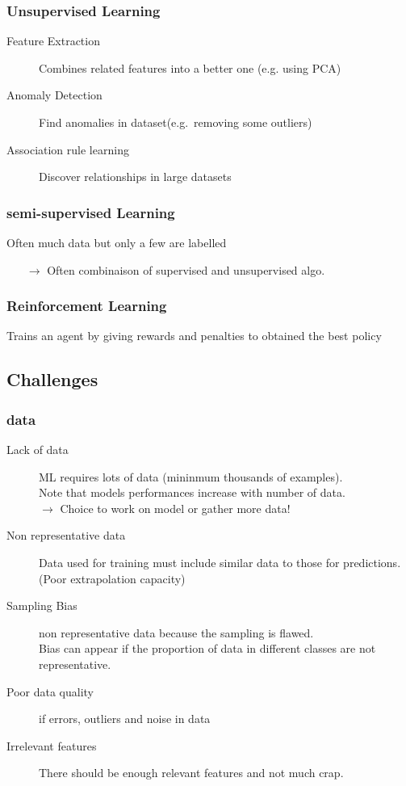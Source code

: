 \subsubsection{Unsupervised Learning}
\begin{description}
    \item[Feature Extraction] Combines related features into a better one (e.g. using PCA)
    \item[Anomaly Detection] Find anomalies in dataset(e.g.\ removing some outliers)
    \item[Association rule learning] Discover relationships in large datasets
\end{description}

\subsubsection{semi-supervised Learning}
Often much data but only a few are labelled
\begin{itemize}
  \item[$\rightarrow$] Often combinaison of supervised and unsupervised algo.
\end{itemize}

\subsubsection{Reinforcement Learning}
Trains an agent by giving rewards and penalties to obtained the best policy

\subsection{Challenges}
\subsubsection{data}
\begin{description}
  \item[Lack of data] ML requires lots of data (mininmum thousands of examples).\\
                      Note that models performances increase with number of data.\\
                      $\rightarrow$ Choice to work on model or gather more data!

  \item[Non representative data] Data used for training must include similar data to those for predictions. (Poor extrapolation capacity)

  \item[Sampling Bias] non representative data because the sampling is flawed.\\
          Bias can appear if the proportion of data in different classes are not representative.

  \item[Poor data quality] if errors, outliers and noise in data

  \item[Irrelevant features] There should be enough relevant features and not much crap.
\end{description}


